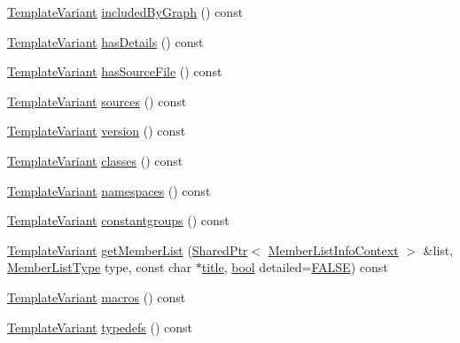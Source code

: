 \begin{DoxyCompactItemize}
\item 
\hyperlink{class_template_variant}{Template\+Variant} \hyperlink{class_file_context_1_1_private_a6af9815ebc7f1e2b1cd9ac811329a745}{included\+By\+Graph} () const 
\item 
\hyperlink{class_template_variant}{Template\+Variant} \hyperlink{class_file_context_1_1_private_ad5416006e8db101b533fb6ffd3678256}{has\+Details} () const 
\item 
\hyperlink{class_template_variant}{Template\+Variant} \hyperlink{class_file_context_1_1_private_a3bd4a01c0d3bcd8e53c8bc93ef1a3cc8}{has\+Source\+File} () const 
\item 
\hyperlink{class_template_variant}{Template\+Variant} \hyperlink{class_file_context_1_1_private_af247aa1e0517f0db9ca8e76ec1094abd}{sources} () const 
\item 
\hyperlink{class_template_variant}{Template\+Variant} \hyperlink{class_file_context_1_1_private_a4bb3247aa1fc5cbc7164bc5f963e12e7}{version} () const 
\item 
\hyperlink{class_template_variant}{Template\+Variant} \hyperlink{class_file_context_1_1_private_ab7c174f75791e42360de787c30afa5f0}{classes} () const 
\item 
\hyperlink{class_template_variant}{Template\+Variant} \hyperlink{class_file_context_1_1_private_ac203485e299188ac8a460bc9e2cf1270}{namespaces} () const 
\item 
\hyperlink{class_template_variant}{Template\+Variant} \hyperlink{class_file_context_1_1_private_af6456c36c14f71efc3d4b6fc4b05d9d0}{constantgroups} () const 
\item 
\hyperlink{class_template_variant}{Template\+Variant} \hyperlink{class_file_context_1_1_private_ae95a637ad2ee3e3a133c7526742b6e2d}{get\+Member\+List} (\hyperlink{class_shared_ptr}{Shared\+Ptr}$<$ \hyperlink{class_member_list_info_context}{Member\+List\+Info\+Context} $>$ \&list, \hyperlink{types_8h_abe8ad5992f8938a28f918f51b199aa19}{Member\+List\+Type} type, const char $\ast$\hyperlink{class_file_context_1_1_private_a5268330e9c6cc427d8b2d1ac854bb3c5}{title}, \hyperlink{qglobal_8h_a1062901a7428fdd9c7f180f5e01ea056}{bool} detailed=\hyperlink{qglobal_8h_a10e004b6916e78ff4ea8379be80b80cc}{F\+A\+L\+S\+E}) const 
\item 
\hyperlink{class_template_variant}{Template\+Variant} \hyperlink{class_file_context_1_1_private_a1b650d57d882f8a21654f042d34c8e2d}{macros} () const 
\item 
\hyperlink{class_template_variant}{Template\+Variant} \hyperlink{class_file_context_1_1_private_a051eeb4730900d0833f8f2a121701996}{typedefs} () const 

\end{DoxyCompactItemize}
